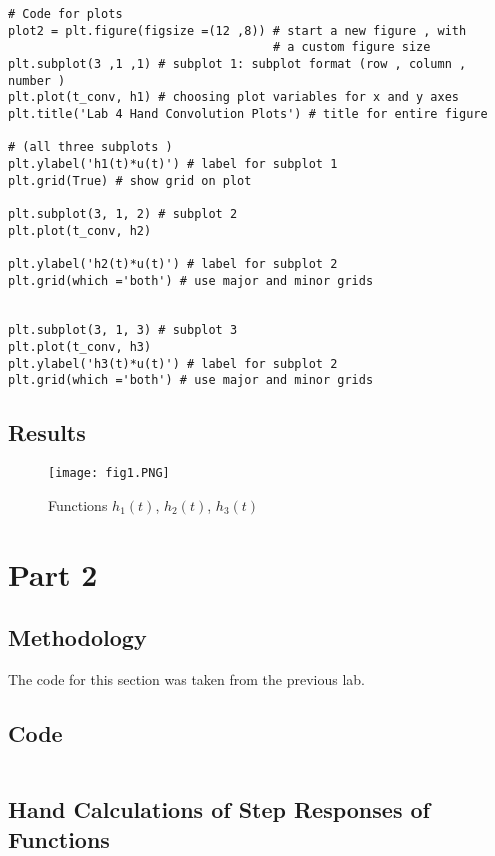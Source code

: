 \begin{scriptsize}
\begin{lstlisting}
# Code for plots
plot2 = plt.figure(figsize =(12 ,8)) # start a new figure , with
                                     # a custom figure size
plt.subplot(3 ,1 ,1) # subplot 1: subplot format (row , column , number )
plt.plot(t_conv, h1) # choosing plot variables for x and y axes
plt.title('Lab 4 Hand Convolution Plots') # title for entire figure

# (all three subplots )
plt.ylabel('h1(t)*u(t)') # label for subplot 1
plt.grid(True) # show grid on plot

plt.subplot(3, 1, 2) # subplot 2
plt.plot(t_conv, h2)

plt.ylabel('h2(t)*u(t)') # label for subplot 2
plt.grid(which ='both') # use major and minor grids


plt.subplot(3, 1, 3) # subplot 3
plt.plot(t_conv, h3)
plt.ylabel('h3(t)*u(t)') # label for subplot 2
plt.grid(which ='both') # use major and minor grids

\end{lstlisting}
\end{scriptsize}

\subsection{Results}

 \begin{figure}[H]
	   \centering
	   \texttt{[image: fig1.PNG]}
	   \caption{Functions $h_{1}(t)$, $h_{2}(t)$, $h_{3}(t)$}
 \end{figure}


\section{Part 2}
\subsection{Methodology}
The code for this section was taken from the previous lab.

\subsection*{Code}
\begin{scriptsize}
\begin{lstlisting}

\end{lstlisting}
\end{scriptsize}
\subsection{Hand Calculations of Step Responses of Functions}
